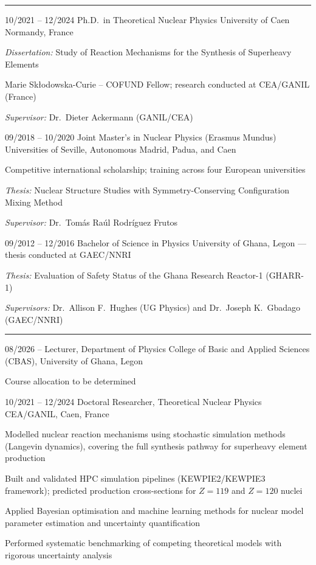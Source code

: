 \documentclass[10pt,a4paper]{article}
\newcommand{\cvsection}[1]{%
  \par\vspace{8pt}%
  \noindent{\large\bfseries\textcolor{maincolor}{#1}}\par
  {\color{maincolor}\rule{\linewidth}{0.6pt}}%
  \vspace{4pt}%
}
\begin{document}
\cvsection{Education}

\diploma
{10/2021 -- 12/2024 \quad Ph.D.\ in Theoretical Nuclear Physics}
{University of Caen Normandy, France}
{
  \item \textit{Dissertation:} Study of Reaction Mechanisms for the
        Synthesis of Superheavy Elements
  \item Marie Sk\l{}odowska-Curie -- COFUND Fellow; research conducted at
        CEA/GANIL (France)
  \item \textit{Supervisor:} Dr.\ Dieter Ackermann (GANIL/CEA)
}

\diploma
{09/2018 -- 10/2020 \quad Joint Master's in Nuclear Physics
(Erasmus Mundus)}
{Universities of Seville, Autonomous Madrid, Padua, and Caen}
{
  \item Competitive international scholarship; training across four
        European universities
  \item \textit{Thesis:} Nuclear Structure Studies with
        Symmetry-Conserving Configuration Mixing Method
  \item \textit{Supervisor:} Dr.\ Tom\'{a}s Ra\'{u}l Rodr\'{i}guez
        Frutos
}

\diploma
{09/2012 -- 12/2016 \quad Bachelor of Science in Physics}
{University of Ghana, Legon --- thesis conducted at GAEC/NNRI}
{
  \item \textit{Thesis:} Evaluation of Safety Status of the Ghana
        Research Reactor-1 (GHARR-1)
  \item \textit{Supervisors:} Dr.\ Allison F.\ Hughes (UG Physics)
        and Dr.\ Joseph K.\ Gbadago (GAEC/NNRI)
}

\cvsection{Academic and Research Appointments}

\timelineitem
{08/2026 -- \quad Lecturer, Department of Physics}
{College of Basic and Applied Sciences (CBAS), University of Ghana, Legon}
{
  \item Course allocation to be determined
}

\timelineitem
{10/2021 -- 12/2024 \quad Doctoral Researcher,
Theoretical Nuclear Physics}
{CEA/GANIL, Caen, France}
{
  \item Modelled nuclear reaction mechanisms using stochastic
        simulation methods (Langevin dynamics), covering the full
        synthesis pathway for superheavy element production
  \item Built and validated HPC simulation pipelines (KEWPIE2/KEWPIE3
        framework); predicted production cross-sections for
        $Z=119$ and $Z=120$ nuclei
  \item Applied Bayesian optimisation and machine learning methods
        for nuclear model parameter estimation and uncertainty
        quantification
  \item Performed systematic benchmarking of competing theoretical
        models with rigorous uncertainty analysis
}
\end{document}
